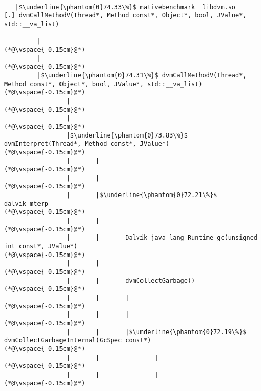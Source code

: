 
\begin{lstlisting}[caption=NewDirectByteBuffer, label=profile:C2JNewDirectBuffer-512, numberbychapter=true, frame=lines, float, floatplacement=t]

   |$\underline{\phantom{0}74.33\%}$ nativebenchmark  libdvm.so           [.] dvmCallMethodV(Thread*, Method const*, Object*, bool, JValue*, std::__va_list)

         |
(*@\vspace{-0.15cm}@*)
         |
(*@\vspace{-0.15cm}@*)
         |$\underline{\phantom{0}74.31\%}$ dvmCallMethodV(Thread*, Method const*, Object*, bool, JValue*, std::__va_list)
(*@\vspace{-0.15cm}@*)
                 |
(*@\vspace{-0.15cm}@*)
                 |
(*@\vspace{-0.15cm}@*)
                 |$\underline{\phantom{0}73.83\%}$ dvmInterpret(Thread*, Method const*, JValue*)
(*@\vspace{-0.15cm}@*)
                 |       |
(*@\vspace{-0.15cm}@*)
                 |       |
(*@\vspace{-0.15cm}@*)
                 |       |$\underline{\phantom{0}72.21\%}$ dalvik_mterp
(*@\vspace{-0.15cm}@*)
                 |       |
(*@\vspace{-0.15cm}@*)
                 |       |       Dalvik_java_lang_Runtime_gc(unsigned int const*, JValue*)
(*@\vspace{-0.15cm}@*)
                 |       |
(*@\vspace{-0.15cm}@*)
                 |       |       dvmCollectGarbage()
(*@\vspace{-0.15cm}@*)
                 |       |       |
(*@\vspace{-0.15cm}@*)
                 |       |       |
(*@\vspace{-0.15cm}@*)
                 |       |       |$\underline{\phantom{0}72.19\%}$ dvmCollectGarbageInternal(GcSpec const*)
(*@\vspace{-0.15cm}@*)
                 |       |               |
(*@\vspace{-0.15cm}@*)
                 |       |               |
(*@\vspace{-0.15cm}@*)

\end{lstlisting}
